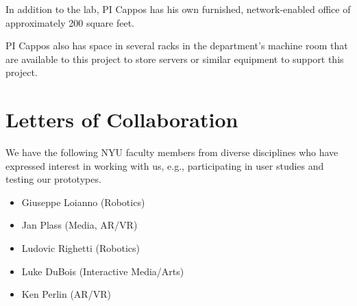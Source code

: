 In addition to the lab, PI Cappos has his own furnished, network-enabled office
of approximately 200 square feet.

PI Cappos also has space in several racks in the department's
machine room that are available to this project to store servers or similar
equipment to support this project.




\section*{Letters of Collaboration}

We have the following NYU faculty members from diverse disciplines who have expressed interest in working with us, e.g., participating in user studies and testing our prototypes.

\begin{itemize}[nolistsep]
    \item Giuseppe Loianno (Robotics)
    \item Jan Plass (Media, AR/VR)
    \item Ludovic Righetti (Robotics)
    \item Luke DuBois (Interactive Media/Arts)
    \item Ken Perlin (AR/VR)
\end{itemize}

